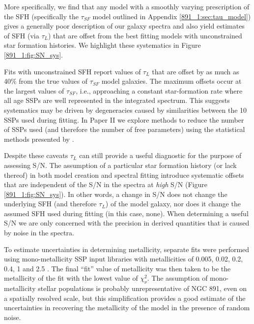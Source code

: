More specifically, we find that any model with a smoothly varying
prescription of the SFH (specifically the $\tau_{SF}$ model outlined
in Appendix \ref{891_1:sec:tau_model}) gives a generally poor description of
our galaxy spectra and also yield estimates of SFH (via $\tau_L$) that
are offset from the best fitting models with unconstrained star
formation histories. We highlight these systematics in Figure
\ref{891_1:fig:SN_sys}.

Fits with unconstrained SFH report values of $\tau_L$ that are offset
by as much as 40\% from the true values of $\tau_{SF}$ model
galaxies. The maximum offsets occur at the largest values of
$\tau_{SF}$, i.e., approaching a constant star-formation rate where
all age SSPs are well represented in the integrated spectrum.  This
suggests systematics may be driven by degeneracies caused by
similarities between the 10 SSPs used during fitting.  In Paper II we
explore methods to reduce the number of SSPs used (and therefore the
number of free parameters) using the statistical methods presented by
\citet{Mosby15}.



Despite these caveats $\tau_L$ can still provide a useful diagnostic
for the purpose of assessing S/N. The assumption of a particular star
formation history (or lack thereof) in both model creation and
spectral fitting introduce systematic offsets that are independent of
the S/N in the spectra at {\it high} S/N (Figure \ref{891_1:fig:SN_sys}). In
other words, a change in S/N does not change the underlying SFH (and
therefore $\tau_L$) of the model galaxy, nor does it change the
assumed SFH used during fitting (in this case, none). When determining
a useful S/N we are only concerned with the precision in derived
quantities that is caused by noise in the spectra.

To estimate uncertainties in determining metallicity, separate fits
were performed using mono-metallicity SSP input libraries with
metallicities of 0.005, 0.02, 0.2, 0.4, 1 and 2.5 \Zsol.  The final
``fit'' value of metallicity was then taken to be the metallicity of
the fit with the lowest value of $\chi^2_\nu$. The assumption of
mono-metallicity stellar populations is probably unrepresentative of
NGC 891, even on a spatially resolved scale, but this simplification
provides a good estimate of the uncertainties in recovering the
metallicity of the model in the presence of random noise.

